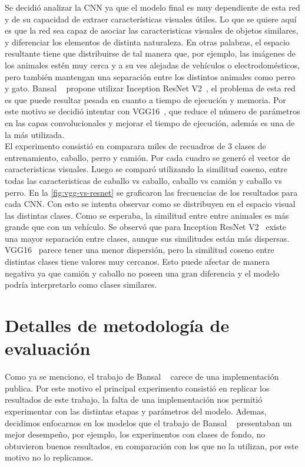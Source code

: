 Se decidió analizar la CNN ya que el modelo final es muy dependiente de esta red y de su capacidad de extraer características visuales útiles. Lo que se quiere aquí es que la red sea capaz de asociar las caracteristicas visuales de objetos similares, y diferenciar los elementos de distinta naturaleza. En otras palabras, el espacio resultante tiene que distribuirse de tal manera que, por ejemplo, las imágenes de los animales estén muy cerca y a su ves alejadas de vehículos o electrodomésticos, pero también mantengan una separación entre los distintos animales como perro y gato. Bansal \etal~\cite{bansal2018zero} propone utilizar Inception ResNet V2~\cite{resnet}, el problema de esta red es que puede resultar pesada en cuanto a tiempo de ejecución y memoria. Por este motivo se decidió intentar con VGG16~\cite{simonyan2014very}, que reduce el número de parámetros en las capas convolucionales y mejorar el tiempo de ejecución, además es una de la más utilizada.\\

El experimento consistió en comparara miles de recuadros de 3 clases de entrenamiento, caballo, perro y camión.  Por cada cuadro se generó el vector de caracteristicas visuales. Luego se comparó utilizando la similitud coseno, entre todas las caracteristicas de caballo vs caballo, caballo vs camión y caballo vs perro. En la \autoref{fig:vgg-vs-resnet} se graficaron las frecuencias de los resultados para cada CNN. Con esto se intenta observar como se distribuyen en el espacio visual las distintas clases. Como se esperaba, la similitud entre entre animales es más grande que con un vehículo. Se observó que para Inception ResNet V2~\cite{resnet} existe una mayor separación entre clases, aunque sus similitudes están más dispersas. VGG16~\cite{simonyan2014very} parece tener una menor dispersión, pero la similitud coseno entre distintas clases tiene valores muy cercanos. Esto puede afectar de manera negativa ya que camión y caballo no poseen una gran diferencia y el modelo podría interpretarlo como clases similares.\\


\section{Detalles de metodología de evaluación} \label{sec:detallesdemetodologiadeevaluacion}
Como ya se menciono, el trabajo de Bansal \etal~\cite{bansal2018zero} carece de una implementación publica. Por este motivo el principal experimento consistió en replicar los resultados de este trabajo, la falta de una implementación nos permitió experimentar con las distintas etapas y parámetros del modelo. Ademas, decidimos enfocarnos en los modelos que el trabajo de Bansal \etal~\cite{bansal2018zero}  presentaban un mejor desempeño, por ejemplo, los experimentos con clases de fondo, no obtuvieron buenos resultados, en comparación con los que no la utilizan, por este motivo no lo replicamos.\\

